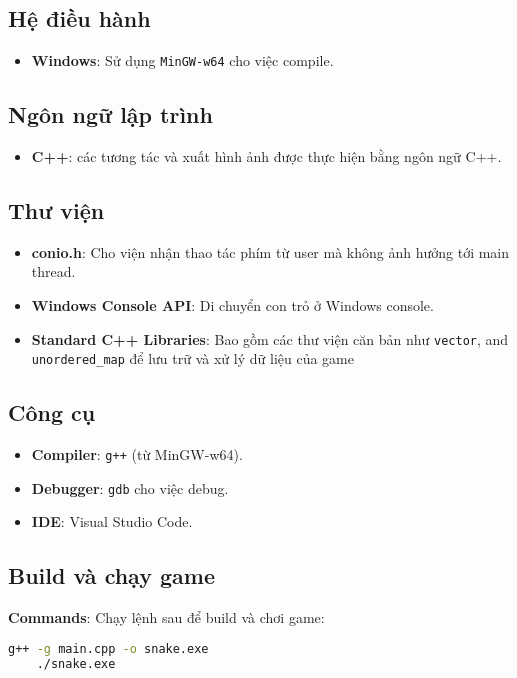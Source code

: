 \documentclass[12pt]{report}
\begin{document}
\subsection*{Hệ điều hành}
\begin{itemize}
    \item \textbf{Windows}: Sử dụng \texttt{MinGW-w64} cho việc compile.
\end{itemize}

\subsection*{Ngôn ngữ lập trình}
\begin{itemize}
    \item \textbf{C++}: các tương tác và xuất hình ảnh được thực hiện bằng ngôn ngữ C++.
\end{itemize}

\subsection*{Thư viện}
\begin{itemize}
    \item \textbf{conio.h}: Cho viện nhận thao tác phím từ user mà không ảnh hưởng tới main thread.
    \item \textbf{Windows Console API}: Di chuyển con trỏ ở Windows console.
    \item \textbf{Standard C++ Libraries}: Bao gồm các thư viện căn bản như \texttt{vector}, and \texttt{unordered\_map} để lưu trữ và xử lý dữ liệu của game
\end{itemize}

\subsection*{Công cụ}
\begin{itemize}
    \item \textbf{Compiler}: \texttt{g++} (từ MinGW-w64).
    \item \textbf{Debugger}: \texttt{gdb} cho việc debug.
    \item \textbf{IDE}: Visual Studio Code.
\end{itemize}

\subsection*{Build và chạy game}
\textbf{Commands}: Chạy lệnh sau để build và chơi game:
\begin{lstlisting}[language=bash]
    g++ -g main.cpp -o snake.exe
    ./snake.exe
\end{lstlisting}
\end{document}
